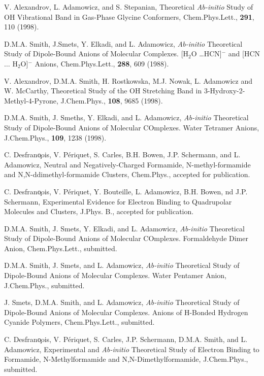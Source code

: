 \begin{thebibliography}{999}
V. Alexandrov, L. Adamowicz, and S. Stepanian,
Theoretical {\it Ab-initio} Study of OH Vibrational Band
in Gas-Phase Glycine Conformers, Chem.Phys.Lett.,
{\bf 291}, 110 (1998).

D.M.A. Smith, J.Smets, Y. Elkadi, and L. Adamowicz,
{\it Ab-initio} Theoretical Study of Dipole-Bound Anions
of Molecular Complexes. [H$_2$O \dots HCN]$^-$ and
[HCN $\dots$ H$_2$O]$^-$ Anions,
Chem.Phys.Lett., {\bf 288}, 609 (1988).

V. Alexandrov, D.M.A. Smith, H. Rostkowska, M.J. Nowak, 
L. Adamowicz and W. McCarthy, 
Theoretical Study of the OH Stretching Band in 3-Hydroxy-2-Methyl-4-Pyrone,
J.Chem.Phys., {\bf 108}, 9685 (1998).

D.M.A. Smith, J. Smeths, Y. Elkadi, and L. Adamowicz,
{\it Ab-initio} Theoretical Study of Dipole-Bound Anions
of Molecular COmplexes. Water Tetramer Anions,
J.Chem.Phys., {\bf 109}, 1238 (1998).


C. Desfran\c{o}ois, V. P\'{e}riquet, S. Carles, B.H. Bowen,
J.P. Schermann, and L. Adamowicz,
Neutral and Negatively-Charged Formamide, N-methyl-formamide
and N,N-ddimethyl-formamide Clusters, Chem.Phys.,
accepted for publication.

C. Desfran\c{o}ois, V. P\'{e}riquet, Y. Bouteille, 
L. Adamowicz, B.H. Bowen,
nd J.P. Schermann,
Experimental Evidence for Electron Binding to
Quadrupolar Molecules and Clusters,
J.Phys. B., accepted for publication.


D.M.A. Smith, J. Smets, Y. Elkadi, and L. Adamowicz,
{\it Ab-initio} Theoretical Study of  Dipole-Bound Anions
of Molecular COmplexes. Formaldehyde Dimer Anion,
Chem.Phys.Lett., submitted.


D.M.A. Smith, J. Smets, and L. Adamowicz,
{\it Ab-initio} Theoretical Study of Dipole-Bound Anions of
Molecular Complexes. Water Pentamer Anion,
J.Chem.Phys., submitted.


J. Smets, D.M.A. Smith, and L. Adamowicz,
{\it Ab-initio} Theoretical Study of Dipole-Bound
Anions of Molecular Complexes. Anions of H-Bonded Hydrogen Cyanide Polymers,
Chem.Phys.Lett., submitted.




C. Desfran\c{o}ois, V. P\'{e}riquet, S. Carles, J.P. Schermann,
D.M.A. Smith, and L. Adamowicz,
Experimental and {\it Ab-initio} Theoretical Study of Electron
Binding to Formamide, N-Methylformamide and N,N-Dimethylformamide,
J.Chem.Phys., submitted.



\end{thebibliography}
